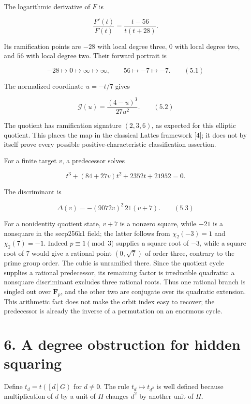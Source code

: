 \documentclass[
  11pt,
  a4paper,
]{article}
\begin{document}
The logarithmic derivative of \(F\) is

\[
\frac{F'(t)}{F(t)}=\frac{t-56}{t(t+28)}.
\]

Its ramification points are \(-28\) with local degree three, \(0\) with
local degree two, and \(56\) with local degree two. Their forward
portrait is

\[
-28\longmapsto0\longmapsto\infty\longmapsto\infty,
\qquad 56\longmapsto-7\longmapsto-7. \qquad (5.1)
\]

The normalized coordinate \(u=-t/7\) gives

\[
\mathcal G(u)=\frac{(4-u)^3}{27u^2}. \qquad (5.2)
\]

The quotient has ramification signature \((2,3,6)\), as expected for
this elliptic quotient. This places the map in the classical Lattes
framework {[}4{]}; it does not by itself prove every possible
positive-characteristic classification assertion.

For a finite target \(v\), a predecessor solves

\[
t^3+(84+27v)t^2+2352t+21952=0.
\]

The discriminant is

\[
\Delta(v)=-(9072v)^2\,21(v+7). \qquad (5.3)
\]

For a nonidentity quotient state, \(v+7\) is a nonzero square, while
\(-21\) is a nonsquare in the secp256k1 field; the latter follows from
\(\chi_2(-3)=1\) and \(\chi_2(7)=-1\). Indeed \(p\equiv1\pmod3\)
supplies a square root of \(-3\), while a square root of \(7\) would
give a rational point \((0,\sqrt7)\) of order three, contrary to the
prime group order. The cubic is unramified there. Since the quotient
cycle supplies a rational predecessor, its remaining factor is
irreducible quadratic: a nonsquare discriminant excludes three rational
roots. Thus one rational branch is singled out over \(\mathbf F_p\), and
the other two are conjugate over its quadratic extension. This
arithmetic fact does not make the orbit index easy to recover; the
predecessor is already the inverse of a permutation on an enormous
cycle.

\section{6. A degree obstruction for hidden
squaring}\label{a-degree-obstruction-for-hidden-squaring}

Define \(t_d=t([d]G)\) for \(d\neq0\). The rule \(t_d\mapsto t_{d^2}\)
is well defined because multiplication of \(d\) by a unit of \(H\)
changes \(d^2\) by another unit of \(H\).
\end{document}
